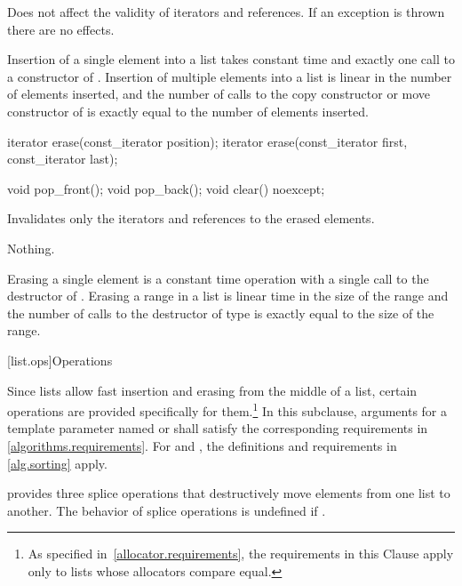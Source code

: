 \begin{itemdescr}
\pnum
\remarks
Does not affect the validity of iterators and references.
If an exception is thrown there are no effects.

\pnum
\complexity
Insertion of a single element into a list takes constant time and
exactly one call to a constructor of
. Insertion of multiple elements into a list is linear in the
number of elements inserted, and the number of calls to the copy
constructor or move constructor of  is exactly equal
to the number of elements inserted.
\end{itemdescr}

%
\begin{itemdecl}
iterator erase(const_iterator position);
iterator erase(const_iterator first, const_iterator last);

void pop_front();
void pop_back();
void clear() noexcept;
\end{itemdecl}

\begin{itemdescr}
\pnum
\effects
Invalidates only the iterators and references to the erased elements.

\pnum
\throws Nothing.

\pnum
\complexity
Erasing a single element is a constant time operation with a single call to the destructor of
.
Erasing a range in a list is linear time in the
size of the range and the number of calls to the destructor of type
is exactly equal to the size of the range.
\end{itemdescr}

[list.ops]{Operations}

\pnum
Since lists allow fast insertion and erasing from the middle of a list, certain
operations are provided specifically for them.\footnote{As specified
in~\ref{allocator.requirements}, the requirements in this Clause apply only to
lists whose allocators compare equal.}
In this subclause,
arguments for a template parameter
named  or 
shall satisfy the corresponding requirements in \ref{algorithms.requirements}.
For  and ,
the definitions and requirements in \ref{alg.sorting} apply.

\pnum
{} provides three splice operations that destructively move elements from one list to
another. The behavior of splice operations is undefined if .

